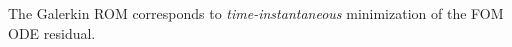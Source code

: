 \documentclass[3p,computermodern,10pt]{elsarticle}
\begin{document}
The Galerkin ROM corresponds to \textit{time-instantaneous} minimization of the FOM ODE residual.
\end{document}
